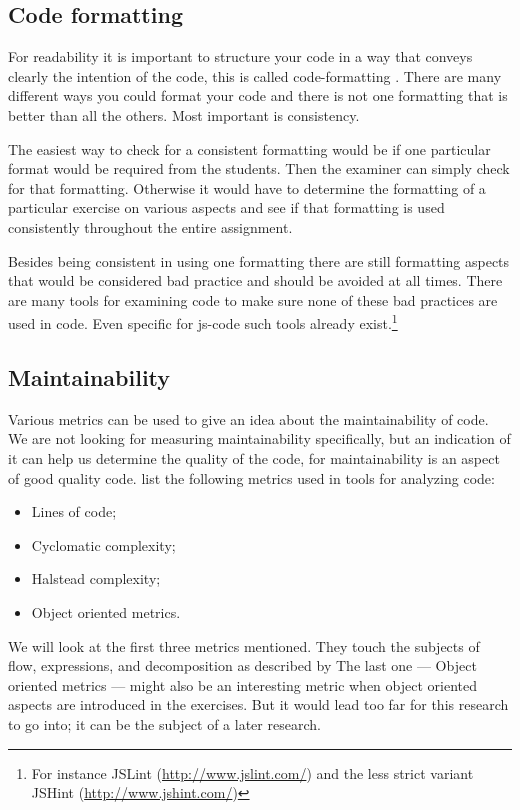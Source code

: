 \subsection{Code formatting}

For readability it is important to structure your \gls{code} in a way
that conveys clearly the intention of the \gls{code},
this is called \gls{code-formatting} \citep{stegeman2014empirically}.
There are many different ways you could format your \gls{code}
and there is not one formatting that is better than all the others.
Most important is consistency.

The easiest way to check for a consistent formatting would be
if one particular format would be required from the \glspl{student}.
Then the \gls{examiner} can simply check for that formatting.
Otherwise it would have to determine the formatting
of a particular \gls{exercise} on various aspects
and see if that formatting is used consistently
throughout the entire assignment.

Besides being consistent in using one formatting
there are still formatting aspects that would be considered bad practice
and should be avoided at all times.
There are many \glspl{tool} for examining \gls{code}
to make sure none of these bad practices are used in \gls{code}.
Even specific for \gls{js-code} such \glspl{tool} already
exist.\footnote{For instance JSLint (\url{http://www.jslint.com/})
and the less strict variant JSHint (\url{http://www.jshint.com/})}

\subsection{Maintainability}

Various metrics can be used to give an idea
about the \gls{maintainability} of \gls{code}.
We are not looking for measuring \gls{maintainability} specifically,
but an indication of it can help us determine the quality of the \gls{code},
for \gls{maintainability} is an aspect of good quality \gls{code}.
\citet{rakic2013problems} list the following metrics
used in tools for analyzing \gls{code}:
\begin{itemize}
  \item Lines of code;
  \item Cyclomatic complexity;
  \item Halstead complexity;
  \item Object oriented metrics.
\end{itemize}
We will look at the first three metrics mentioned.
They touch the subjects of flow, expressions, and decomposition
as described by \citet{stegeman2014empirically}
The last one --- Object oriented metrics ---
might also be an interesting metric
when object oriented aspects are introduced in the \glspl{exercise}.
But it would lead too far for this research to go into;
it can be the subject of a later research.

